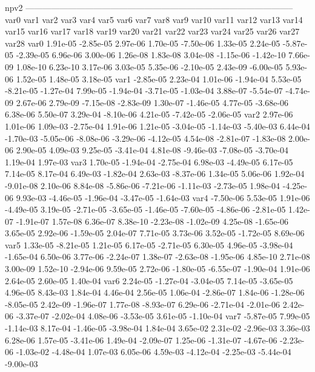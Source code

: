 npv2
-----------------------------------------------------------------------------------------------
var0 var1 var2 var3 var4 var5 var6 var7 var8 var9 var10 var11 var12 var13 var14 var15 var16 var17 var18 var19 var20 var21 var22 var23 var24 var25 var26 var27 var28 
var0  1.91e-05 -2.85e-05  2.97e-06  1.70e-05 -7.50e-06  1.33e-05  2.24e-05 -5.87e-05 -2.39e-05  6.96e-06  3.00e-06  1.26e-08  1.83e-08  3.04e-08 -1.15e-06 -1.42e-10  7.66e-09  1.08e-10  6.23e-10  3.17e-06  3.03e-05  5.35e-06 -2.10e-05  2.43e-09 -6.00e-05  5.93e-06  1.52e-05  1.48e-05  3.18e-05
var1 -2.85e-05  2.23e-04  1.01e-06 -1.94e-04  5.53e-05 -8.21e-05 -1.27e-04  7.99e-05 -1.94e-04 -3.71e-05 -1.03e-04  3.88e-07 -5.54e-07 -4.74e-09  2.67e-06  2.79e-09 -7.15e-08 -2.83e-09  1.30e-07 -1.46e-05  4.77e-05 -3.68e-06  6.38e-06  5.50e-07  3.29e-04 -8.10e-06  4.21e-05 -7.42e-05 -2.06e-05
var2  2.97e-06  1.01e-06  1.09e-03 -2.75e-04  1.91e-06  1.21e-05 -3.04e-05 -1.14e-03 -5.40e-03  6.44e-04 -1.70e-03 -5.05e-06 -8.08e-06 -3.29e-06 -4.12e-05  4.54e-08 -2.81e-07 -1.83e-08  2.00e-06  2.90e-05  4.09e-03  9.25e-05 -3.41e-04  4.81e-08 -9.46e-03 -7.08e-05 -3.70e-04  1.19e-04  1.97e-03
var3  1.70e-05 -1.94e-04 -2.75e-04  6.98e-03 -4.49e-05  6.17e-05  7.14e-05  8.17e-04  6.49e-03 -1.82e-04  2.63e-03 -8.37e-06  1.34e-05  5.06e-06  1.92e-04 -9.01e-08  2.10e-06  8.84e-08 -5.86e-06 -7.21e-06 -1.11e-03 -2.73e-05  1.98e-04 -4.25e-06  9.93e-03 -4.46e-05 -1.96e-04 -3.47e-05 -1.64e-03
var4 -7.50e-06  5.53e-05  1.91e-06 -4.49e-05  3.19e-05 -2.71e-05 -3.65e-05 -1.46e-05 -7.60e-05 -4.86e-06 -2.81e-05  1.42e-07 -1.91e-07  1.57e-08  6.36e-07  8.38e-10 -2.23e-08 -1.02e-09  4.25e-08 -1.65e-06  3.65e-05  2.92e-06 -1.59e-05  2.04e-07  7.71e-05  3.73e-06  3.52e-05 -1.72e-05  8.69e-06
var5  1.33e-05 -8.21e-05  1.21e-05  6.17e-05 -2.71e-05  6.30e-05  4.96e-05 -3.98e-04 -1.65e-04  6.50e-06  3.77e-06 -2.24e-07  1.38e-07 -2.63e-08 -1.95e-06  4.85e-10  2.71e-08  3.00e-09  1.52e-10 -2.94e-06  9.59e-05  2.72e-06 -1.80e-05 -6.55e-07 -1.90e-04  1.91e-06  2.64e-05  2.60e-05  1.40e-04
var6  2.24e-05 -1.27e-04 -3.04e-05  7.14e-05 -3.65e-05  4.96e-05  8.43e-03  1.84e-04  4.46e-04  2.56e-05  1.06e-04 -2.86e-07  1.84e-06 -1.28e-06 -8.05e-05  2.42e-09 -1.96e-07  1.77e-08 -8.93e-07  6.29e-06 -2.71e-04 -2.01e-06  2.42e-06 -3.37e-07 -2.02e-04  4.08e-06 -3.53e-05  3.61e-05 -1.10e-04
var7 -5.87e-05  7.99e-05 -1.14e-03  8.17e-04 -1.46e-05 -3.98e-04  1.84e-04  3.65e-02  2.31e-02 -2.96e-03  3.36e-03  6.28e-06  1.57e-05 -3.41e-06  1.49e-04 -2.09e-07  1.25e-06 -1.31e-07 -4.67e-06 -2.23e-06 -1.03e-02 -4.48e-04  1.07e-03  6.05e-06  4.59e-03 -4.12e-04 -2.25e-03 -5.44e-04 -9.00e-03
